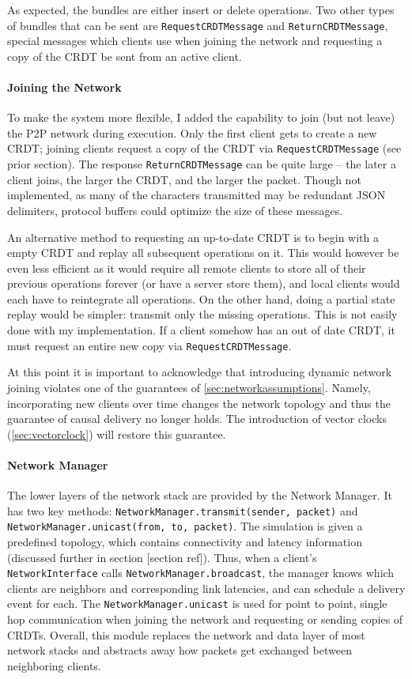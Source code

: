 \documentclass[12pt,a4paper,twoside,openright]{report}
\begin{document}
		As expected, the bundles are either insert or delete operations. Two other types of bundles that can be sent are \lstinline|RequestCRDTMessage| and \lstinline|ReturnCRDTMessage|, special messages which clients use when joining the network and requesting a copy of the CRDT be sent from an active client.
		
		\paragraph{Joining the Network} \label{sec:networkjoin}
		To make the system more flexible, I added the capability to join (but not leave) the P2P network during execution. Only the first client gets to create a new CRDT; joining clients request a copy of the CRDT via \lstinline|RequestCRDTMessage| (see prior section). The response \lstinline|ReturnCRDTMessage| can be quite large -- the later a client joins, the larger the CRDT, and the larger the packet. Though not implemented, as many of the characters transmitted may be redundant JSON delimiters, protocol buffers \cite{protobuf} could optimize the size of these messages.
		
		An alternative method to requesting an up-to-date CRDT is to begin with a empty CRDT and replay all subsequent operations on it. This would however be even less efficient as it would require all remote clients to store all of their previous operations forever (or have a server store them), and local clients would each have to reintegrate all operations. On the other hand, doing a partial state replay would be simpler: transmit only the missing operations. This is not easily done with my implementation. If a client somehow has an out of date CRDT, it must request an entire new copy via \lstinline|RequestCRDTMessage|.
		
		At this point it is important to acknowledge that introducing dynamic network joining violates one of the guarantees of \cref{sec:networkassumptions}. Namely, incorporating new clients over time changes the network topology and thus the guarantee of causal delivery no longer holds. The introduction of vector clocks (\cref{sec:vectorclock}) will restore this guarantee.
		
		\paragraph{Network Manager}
		The lower layers of the network stack are provided by the Network Manager. It has two key methods: \lstinline|NetworkManager.transmit(sender, packet)| and \lstinline|NetworkManager.unicast(from, to, packet)|. The simulation is given a predefined topology, which contains connectivity and latency information (discussed further in section [section ref]). Thus, when a client's \lstinline|NetworkInterface| calls \lstinline|NetworkManager.broadcast|, the manager knows which clients are neighbors and corresponding link latencies, and can schedule a delivery event for each. The \lstinline|NetworkManager.unicast| is used for point to point, single hop communication when joining the network and requesting or sending copies of CRDTs. Overall, this module replaces the network and data layer of most network stacks and abstracts away how packets get exchanged between neighboring clients.
		
\end{document}
